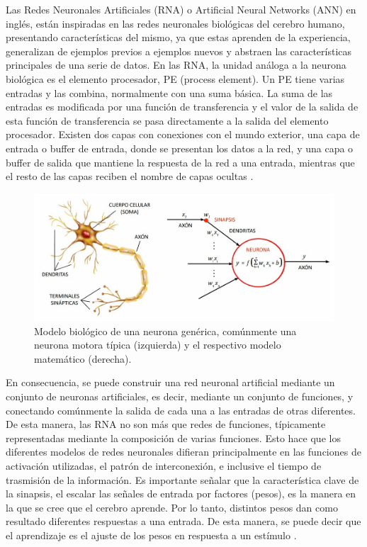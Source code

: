 Las Redes Neuronales Artificiales (RNA) o Artificial Neural Networks (ANN) en inglés, están inspiradas en las redes neuronales biológicas del cerebro humano, presentando características del mismo, ya que estas aprenden de la experiencia, generalizan de ejemplos previos a ejemplos nuevos y abstraen las características principales de una serie de datos. En las RNA, la unidad análoga a la neurona biológica es el elemento procesador, PE (process element). Un PE tiene varias entradas y las combina, normalmente con una suma básica. La suma de las entradas es modificada por una función de transferencia y el valor de la salida de esta función de transferencia se pasa directamente a la salida del elemento procesador. Existen dos capas con conexiones con el mundo exterior, una capa de entrada o buffer de entrada, donde se presentan los datos a la red, y una capa o buffer de salida que mantiene la respuesta de la red a una entrada, mientras que el resto de las capas reciben el nombre de capas ocultas \cite{Basogain08}.\\

\begin{figure} [h!]
    \begin{center}
      \includegraphics[width=12cm]{figs/Modelo neurona.jpeg}
    \end{center}
    \caption{Modelo biológico de una neurona genérica, comúnmente una neurona motora típica (izquierda) y el respectivo modelo matemático (derecha).}
    \label{fig:Modelo neurona}
\end{figure}
\pagebreak

En consecuencia, se puede construir una red neuronal artificial mediante un conjunto de neuronas artificiales, es decir, mediante un conjunto de funciones, y conectando comúnmente la salida de cada una a las entradas de otras diferentes. De esta manera, las RNA no son más que redes de funciones, típicamente representadas mediante la composición de varias funciones. Esto hace que los diferentes modelos de redes neuronales difieran principalmente en las funciones de activación utilizadas, el patrón de interconexión, e inclusive el tiempo de trasmisión de la información. Es importante señalar que la característica clave de la sinapsis, el escalar las señales de entrada por factores (pesos), es la manera en la que se cree que el cerebro aprende. Por lo tanto, distintos pesos dan como resultado diferentes respuestas a una entrada. De esta manera, se puede decir que el aprendizaje es el ajuste de los pesos en respuesta a un estímulo \cite{Dinamarca18}.\\


